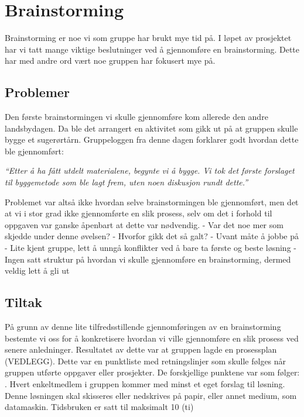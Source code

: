 \section{Brainstorming}
Brainstorming er noe vi som gruppe har brukt mye tid på. I løpet av prosjektet har vi tatt mange viktige beslutninger ved å gjennomføre en brainstorming. Dette har med andre ord vært noe gruppen har fokusert mye på.
\subsection{Problemer}
Den første brainstormingen vi skulle gjennomføre kom allerede den andre landsbydagen. Da ble det arrangert en aktivitet som gikk ut på at gruppen skulle bygge et sugerørtårn. Gruppeloggen fra denne dagen forklarer godt hvordan dette ble gjennomført: \newline

\emph{“Etter å ha fått utdelt materialene, begynte vi å bygge. Vi tok det første forslaget til byggemetode som ble lagt frem, uten noen diskusjon rundt dette.”} \newline

Problemet var altså ikke hvordan selve brainstormingen ble gjennomført, men det at vi i stor grad ikke gjennomførte en slik prosess, selv om det i forhold til oppgaven var ganske åpenbart at dette var nødvendig. \newline
- Var det noe mer som skjedde under denne øvelsen?
- Hvorfor gikk det så galt?
	- Uvant måte å jobbe på
	- Lite kjent gruppe, lett å unngå konflikter ved å bare ta første og beste løsning
	- Ingen satt struktur på hvordan vi skulle gjennomføre en brainstorming, dermed veldig lett å gli ut


\subsection{Tiltak}
På grunn av denne lite tilfredsstillende gjennomføringen av en brainstorming bestemte vi oss for å konkretisere hvordan vi ville gjennomføre en slik prosess ved senere anledninger. Resultatet av dette var at gruppen lagde en prosessplan (VEDLEGG). Dette var en punktliste med retningslinjer som skulle følges når gruppen utførte oppgaver eller prosjekter. De forskjellige punktene var som følger: . Hvert enkeltmedlem i gruppen kommer med minst et eget forslag til løsning. Denne løsningen skal skisseres eller nedskrives på papir, eller annet medium, som datamaskin. Tidsbruken er satt til maksimalt 10 (ti) %

